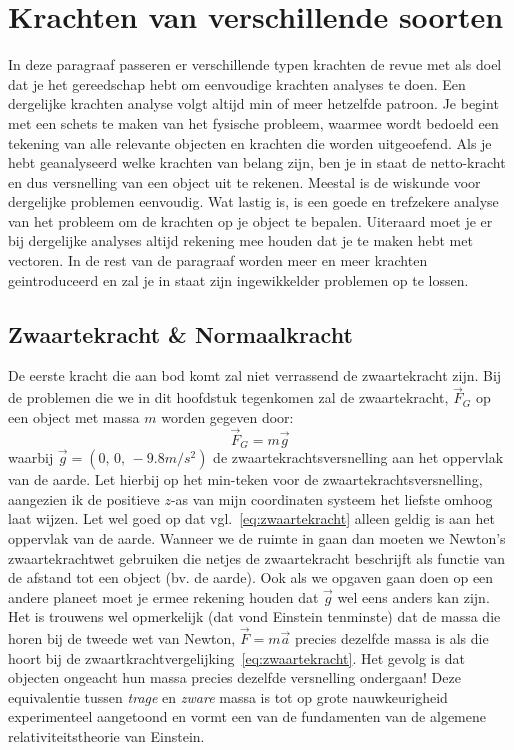 \section{Krachten van verschillende soorten}

In deze paragraaf passeren er verschillende typen krachten de revue met als doel dat je het
gereedschap hebt om eenvoudige krachten analyses te doen. Een dergelijke krachten analyse
volgt altijd min of meer hetzelfde patroon. Je begint met een schets te maken van het fysische
probleem, waarmee wordt bedoeld een tekening van alle relevante objecten en krachten die
worden uitgeoefend. Als je hebt geanalyseerd welke krachten van belang zijn, ben je in staat
de netto-kracht en dus versnelling van een object uit te rekenen. Meestal is de wiskunde voor
dergelijke problemen eenvoudig. Wat lastig is, is een goede en trefzekere analyse van het 
probleem om de krachten op je object te bepalen. Uiteraard moet je er bij dergelijke analyses altijd
rekening mee houden dat je te maken hebt met vectoren. In de rest van de paragraaf worden 
meer en meer krachten geintroduceerd en zal je in staat zijn ingewikkelder problemen op
te lossen.

\subsection{Zwaartekracht \& Normaalkracht}

De eerste kracht die aan bod komt zal niet verrassend de zwaartekracht zijn. Bij de problemen
die we in dit hoofdstuk tegenkomen zal de zwaartekracht, $\vec{F}_G$ op een object met massa
$m$  worden gegeven door:
\begin{equation}\label{eq:zwaartekracht}
\vec{F}_G = m \vec{g}
\end{equation}
waarbij $\vec{g}=(0,\,0,\,-9.8m/s^2)$ de zwaartekrachtsversnelling aan het oppervlak van de aarde.
Let hierbij op het min-teken voor de zwaartekrachtsversnelling, aangezien ik de positieve
$z$-as van mijn coordinaten systeem het liefste omhoog laat wijzen.  Let wel goed op dat
vgl.~\ref{eq:zwaartekracht} alleen geldig is aan het oppervlak van de aarde. Wanneer we de ruimte in
gaan dan moeten we Newton's zwaartekrachtwet gebruiken die netjes de zwaartekracht  beschrijft
als functie van de afstand tot een object (bv. de aarde). Ook als we opgaven gaan doen op een 
andere planeet moet je ermee rekening houden dat $\vec{g}$ wel eens anders kan zijn. 
Het is trouwens wel opmerkelijk (dat vond Einstein tenminste) dat de massa die horen bij
de tweede wet van Newton, $\vec{F}=m\vec{a}$ precies dezelfde massa is als die hoort
bij de zwaartkrachtvergelijking~\ref{eq:zwaartekracht}. Het gevolg is dat objecten ongeacht
hun massa precies dezelfde versnelling ondergaan! Deze equivalentie tussen {\it trage} en
{\it zware} massa is tot op grote nauwkeurigheid experimenteel aangetoond en vormt
een van de fundamenten van de algemene relativiteitstheorie van Einstein.


